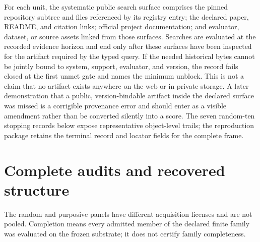 For each unit, the systematic public search surface comprises the pinned repository subtree and files referenced by its registry entry; the declared paper, README, and citation links; official project documentation; and evaluator, dataset, or source assets linked from those surfaces.  Searches are evaluated at the recorded evidence horizon and end only after these surfaces have been inspected for the artifact required by the typed query.  If the needed historical bytes cannot be jointly bound to system, support, evaluator, and version, the record fails closed at the first unmet gate and names the minimum unblock.  This is not a claim that no artifact exists anywhere on the web or in private storage.  A later demonstration that a public, version-bindable artifact inside the declared surface was missed is a corrigible provenance error and should enter as a visible amendment rather than be converted silently into a score.  The seven random-ten stopping records below expose representative object-level trails; the reproduction package retains the terminal record and locator fields for the complete frame.

\section{Complete audits and recovered structure}
\label{app:complete-audit-records}

The random and purposive panels have different acquisition licenses and are not pooled.  Completion means every admitted member of the declared finite family was evaluated on the frozen substrate; it does not certify family completeness.

